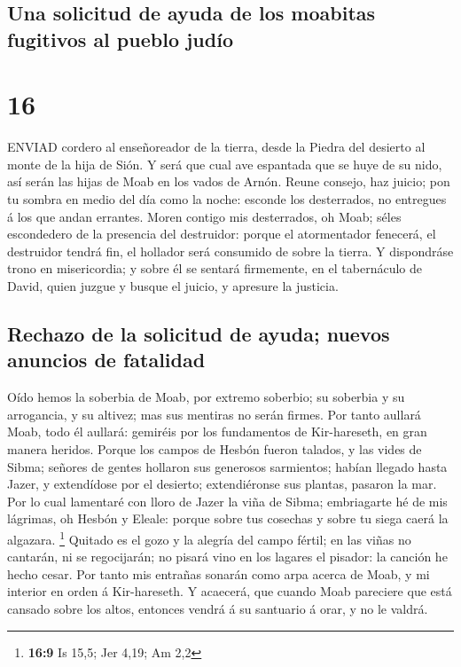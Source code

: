 \hypertarget{una-solicitud-de-ayuda-de-los-moabitas-fugitivos-al-pueblo-juduxedo}{%
\subsection{Una solicitud de ayuda de los moabitas fugitivos al pueblo
judío}\label{una-solicitud-de-ayuda-de-los-moabitas-fugitivos-al-pueblo-juduxedo}}

\hypertarget{section-15}{%
\section{16}\label{section-15}}

 ENVIAD cordero al enseñoreador de la tierra, desde la
Piedra del desierto al monte de la hija de Sión.  Y será que
cual ave espantada que se huye de su nido, así serán las hijas de Moab
en los vados de Arnón.  Reune consejo, haz juicio; pon tu
sombra en medio del día como la noche: esconde los desterrados, no
entregues á los que andan errantes.  Moren contigo mis
desterrados, oh Moab; séles escondedero de la presencia del destruidor:
porque el atormentador fenecerá, el destruidor tendrá fin, el hollador
será consumido de sobre la tierra.  Y dispondráse trono en
misericordia; y sobre él se sentará firmemente, en el tabernáculo de
David, quien juzgue y busque el juicio, y apresure la justicia.

\hypertarget{rechazo-de-la-solicitud-de-ayuda-nuevos-anuncios-de-fatalidad}{%
\subsection{Rechazo de la solicitud de ayuda; nuevos anuncios de
fatalidad}\label{rechazo-de-la-solicitud-de-ayuda-nuevos-anuncios-de-fatalidad}}

 Oído hemos la soberbia de Moab, por extremo soberbio; su
soberbia y su arrogancia, y su altivez; mas sus mentiras no serán
firmes.  Por tanto aullará Moab, todo él aullará: gemiréis
por los fundamentos de Kir-hareseth, en gran manera heridos.
 Porque los campos de Hesbón fueron talados, y las vides de
Sibma; señores de gentes hollaron sus generosos sarmientos; habían
llegado hasta Jazer, y extendídose por el desierto; extendiéronse sus
plantas, pasaron la mar.  Por lo cual lamentaré con lloro de
Jazer la viña de Sibma; embriagarte hé de mis lágrimas, oh Hesbón y
Eleale: porque sobre tus cosechas y sobre tu siega caerá la algazara.
\footnote{\textbf{16:9} Is 15,5; Jer 4,19; Am 2,2}  Quitado
es el gozo y la alegría del campo fértil; en las viñas no cantarán, ni
se regocijarán; no pisará vino en los lagares el pisador: la canción he
hecho cesar.  Por tanto mis entrañas sonarán como arpa
acerca de Moab, y mi interior en orden á Kir-hareseth.  Y
acaecerá, que cuando Moab pareciere que está cansado sobre los altos,
entonces vendrá á su santuario á orar, y no le valdrá.

